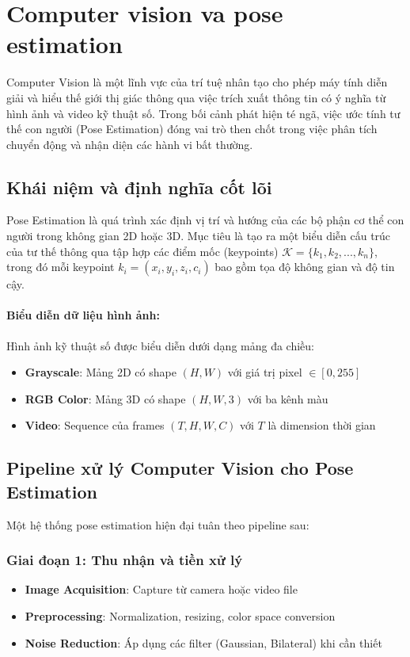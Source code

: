 \section{Computer vision va pose estimation}



Computer Vision là một lĩnh vực của trí tuệ nhân tạo cho phép máy tính diễn giải và hiểu thế giới thị giác thông qua việc trích xuất thông tin có ý nghĩa từ hình ảnh và video kỹ thuật số. Trong bối cảnh phát hiện té ngã, việc ước tính tư thế con người (Pose Estimation) đóng vai trò then chốt trong việc phân tích chuyển động và nhận diện các hành vi bất thường.

\subsection{Khái niệm và định nghĩa cốt lõi}

Pose Estimation là quá trình xác định vị trí và hướng của các bộ phận cơ thể con người trong không gian 2D hoặc 3D. Mục tiêu là tạo ra một biểu diễn cấu trúc của tư thế thông qua tập hợp các điểm mốc (keypoints) $\mathcal{K} = \{k_1, k_2, ..., k_n\}$, trong đó mỗi keypoint $k_i = (x_i, y_i, z_i, c_i)$ bao gồm tọa độ không gian và độ tin cậy.

\paragraph{Biểu diễn dữ liệu hình ảnh:}
Hình ảnh kỹ thuật số được biểu diễn dưới dạng mảng đa chiều:
\begin{itemize}
    \item \textbf{Grayscale}: Mảng 2D có shape $(H, W)$ với giá trị pixel $\in [0, 255]$
    \item \textbf{RGB Color}: Mảng 3D có shape $(H, W, 3)$ với ba kênh màu
    \item \textbf{Video}: Sequence của frames $(T, H, W, C)$ với $T$ là dimension thời gian
\end{itemize}

\subsection{Pipeline xử lý Computer Vision cho Pose Estimation}

Một hệ thống pose estimation hiện đại tuân theo pipeline sau:

\subsubsection{Giai đoạn 1: Thu nhận và tiền xử lý}
\begin{itemize}
    \item \textbf{Image Acquisition}: Capture từ camera hoặc video file
    \item \textbf{Preprocessing}: Normalization, resizing, color space conversion
    \item \textbf{Noise Reduction}: Áp dụng các filter (Gaussian, Bilateral) khi cần thiết
\end{itemize}

